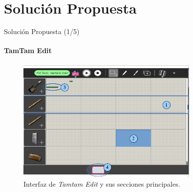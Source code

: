 \section{Soluci\'on Propuesta}

\begin{frame}{Soluci\'on Propuesta (1/5)}
\framesubtitle{TamTam Edit}

\begin{figure}[H]
\centering
\includegraphics[width=0.8\textwidth]{./graphics/ui-tamtam-edit.png}
\caption{Interfaz de \emph{Tamtam Edit} y sus secciones principales.}
\label{figure:ui-tamtam}
\end{figure}

\end{frame}

